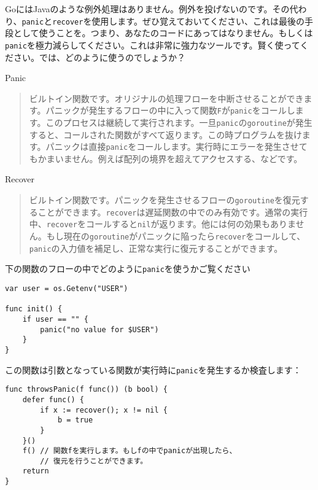 GoにはJavaのような例外処理はありません。例外を投げないのです。その代わり、\texttt{panic}と\texttt{recover}を使用します。ぜひ覚えておいてください、これは最後の手段として使うことを。つまり、あなたのコードにあってはなりません。もしくは\texttt{panic}を極力減らしてください。これは非常に強力なツールです。賢く使ってください。では、どのように使うのでしょうか？


Panic
\begin{quote}
ビルトイン関数です。オリジナルの処理フローを中断させることができます。パニックが発生するフローの中に入って関数\texttt{F}が\texttt{panic}をコールします。このプロセスは継続して実行されます。一旦\texttt{panic}の\texttt{goroutine}が発生すると、コールされた関数がすべて返ります。この時プログラムを抜けます。パニックは直接\texttt{panic}をコールします。実行時にエラーを発生させてもかまいません。例えば配列の境界を超えてアクセスする、などです。
\end{quote}


Recover
\begin{quote}
ビルトイン関数です。パニックを発生させるフローの\texttt{goroutine}を復元することができます。\texttt{recover}は遅延関数の中でのみ有効です。通常の実行中、\texttt{recover}をコールすると\texttt{nil}が返ります。他には何の効果もありません。もし現在の\texttt{goroutine}がパニックに陥ったら\texttt{recover}をコールして、\texttt{panic}の入力値を補足し、正常な実行に復元することができます。
\end{quote}

下の関数のフローの中でどのように\texttt{panic}を使うかご覧ください

\begin{lstlisting}[numbers=none]
var user = os.Getenv("USER")

func init() {
    if user == "" {
        panic("no value for $USER")
    }
}
\end{lstlisting}

この関数は引数となっている関数が実行時に\texttt{panic}を発生するか検査します：

\begin{lstlisting}[numbers=none]
func throwsPanic(f func()) (b bool) {
    defer func() {
        if x := recover(); x != nil {
            b = true
        }
    }()
    f() // 関数fを実行します。もしfの中でpanicが出現したら、
        // 復元を行うことができます。
    return
}
\end{lstlisting}

